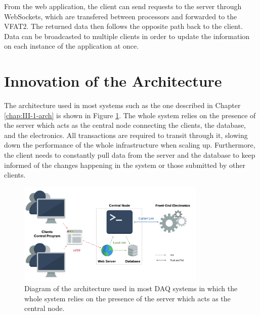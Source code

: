       From the web application, the client can send requests to the server through WebSockets, which are transfered between processors and forwarded to the VFAT2. The returned data then follows the opposite path back to the client. Data can be broadcasted to multiple clients in order to update the information on each instance of the application at once.

  \section{Innovation of the Architecture}

    The architecture used in most systems such as the one described in Chapter \ref{chap:III-1-arch} is shown in Figure \ref{fig:III-2-system-old}. The whole system relies on the presence of the server which acts as the central node connecting the clients, the database, and the electronics. All transactions are required to transit through it, slowing down the performance of the whole infrastructure when scaling up. Furthermore, the client needs to constantly pull data from the server and the database to keep informed of the changes happening in the system or those submitted by other clients. \\

    \begin{figure}[t!]
      \centering
      \includegraphics[width=0.8\textwidth]{img/III-2-web-daq/old-sys.png}
      \caption{Diagram of the architecture used in most DAQ systems in which the whole system relies on the presence of the server which acts as the central node.}
      \label{fig:III-2-system-old}
    \end{figure}

